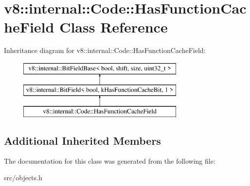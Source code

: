 \hypertarget{classv8_1_1internal_1_1_code_1_1_has_function_cache_field}{}\section{v8\+:\+:internal\+:\+:Code\+:\+:Has\+Function\+Cache\+Field Class Reference}
\label{classv8_1_1internal_1_1_code_1_1_has_function_cache_field}
Inheritance diagram for v8\+:\+:internal\+:\+:Code\+:\+:Has\+Function\+Cache\+Field\+:\begin{figure}[H]
\begin{center}
\leavevmode
\includegraphics[height=3.000000cm]{classv8_1_1internal_1_1_code_1_1_has_function_cache_field}
\end{center}
\end{figure}
\subsection*{Additional Inherited Members}


The documentation for this class was generated from the following file\+:\begin{DoxyCompactItemize}
\item 
src/objects.\+h\end{DoxyCompactItemize}
